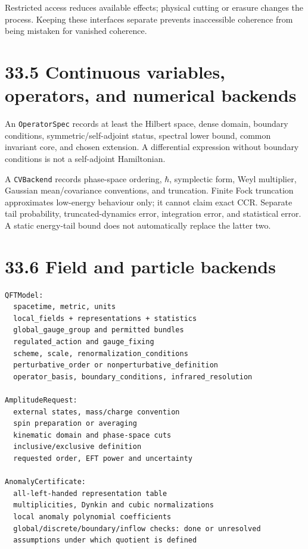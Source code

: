 \documentclass[
  11pt,
  oneside]{book}
\begin{document}
Restricted access reduces available effects; physical cutting or erasure
changes the process. Keeping these interfaces separate prevents
inaccessible coherence from being mistaken for vanished coherence.

\section{33.5 Continuous variables, operators, and numerical backends}

An \texttt{Operator\allowbreak Spec} records at least the Hilbert space, dense
domain, boundary conditions, symmetric/self-adjoint status, spectral
lower bound, common invariant core, and chosen extension. A differential
expression without boundary conditions is not a self-adjoint
Hamiltonian.

A \texttt{CVBackend} records phase-space ordering, \(\hbar\), symplectic
form, Weyl multiplier, Gaussian mean/covariance conventions, and
truncation. Finite Fock truncation approximates low-energy behaviour
only; it cannot claim exact CCR. Separate tail probability,
truncated-dynamics error, integration error, and statistical error. A
static energy-tail bound does not automatically replace the latter two.

\section{33.6 Field and particle backends}

\begin{Verbatim}[breaklines,breakanywhere,fontsize=\scriptsize]
QFTModel:
  spacetime, metric, units
  local_fields + representations + statistics
  global_gauge_group and permitted bundles
  regulated_action and gauge_fixing
  scheme, scale, renormalization_conditions
  perturbative_order or nonperturbative_definition
  operator_basis, boundary_conditions, infrared_resolution

AmplitudeRequest:
  external states, mass/charge convention
  spin preparation or averaging
  kinematic domain and phase-space cuts
  inclusive/exclusive definition
  requested order, EFT power and uncertainty

AnomalyCertificate:
  all-left-handed representation table
  multiplicities, Dynkin and cubic normalizations
  local anomaly polynomial coefficients
  global/discrete/boundary/inflow checks: done or unresolved
  assumptions under which quotient is defined
\end{Verbatim}
\end{document}
